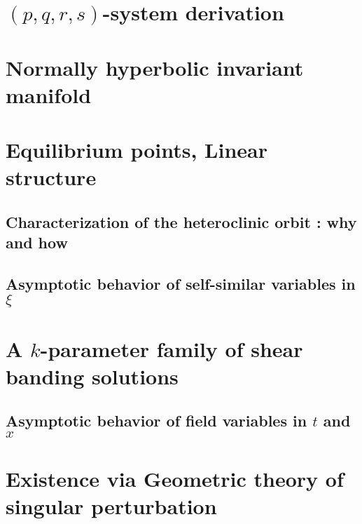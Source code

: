 \documentclass[a4paper,11pt]{article}
\begin{document}
\section{$(p,q,r,s)$-system derivation}
\section{Normally hyperbolic invariant manifold}
\section{Equilibrium points, Linear structure}
\subsection{Characterization of the heteroclinic orbit : why and how}
\subsection{Asymptotic behavior of self-similar variables in $\xi$}
\section{A $k$-parameter family of shear banding solutions}
\subsection{Asymptotic behavior of field variables in $t$ and $x$}
\section{Existence via Geometric theory of singular perturbation}
\end{document}
